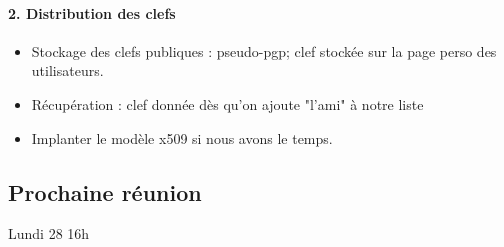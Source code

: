 \documentclass[a4paper,10pt]{article}
\begin{document}
\paragraph{2. Distribution des clefs}
\begin{itemize}
\item Stockage des clefs publiques : pseudo-pgp; clef stockée sur la page perso 
des utilisateurs.
\item Récupération : clef donnée dès qu'on ajoute "l'ami" à notre liste
\item Implanter le modèle x509 si nous avons le temps.
\end{itemize}

\subsection*{Prochaine réunion}
    Lundi 28 16h 
\end{document}
